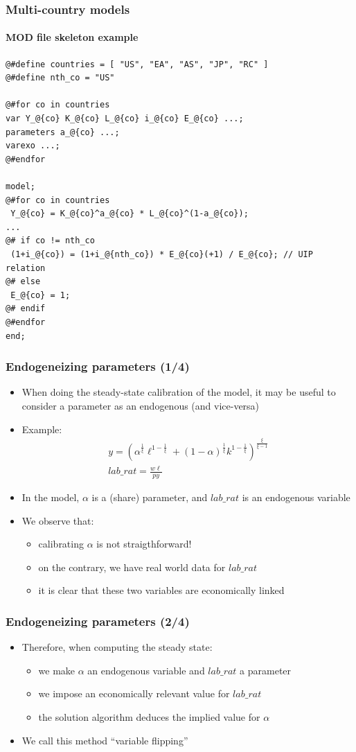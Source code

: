 \documentclass{beamer}
\begin{document}
\begin{frame}[fragile=singleslide]
  \frametitle{Multi-country models}
  \framesubtitle{MOD file skeleton example}
  \scriptsize
\begin{verbatim}
@#define countries = [ "US", "EA", "AS", "JP", "RC" ]
@#define nth_co = "US"

@#for co in countries
var Y_@{co} K_@{co} L_@{co} i_@{co} E_@{co} ...;
parameters a_@{co} ...;
varexo ...;
@#endfor

model;
@#for co in countries
 Y_@{co} = K_@{co}^a_@{co} * L_@{co}^(1-a_@{co});
...
@# if co != nth_co
 (1+i_@{co}) = (1+i_@{nth_co}) * E_@{co}(+1) / E_@{co}; // UIP relation
@# else
 E_@{co} = 1;
@# endif
@#endfor
end;
\end{verbatim}
  \normalsize
\end{frame}

\begin{frame}
  \frametitle{Endogeneizing parameters (1/4)}
  \begin{itemize}
  \item When doing the steady-state calibration of the model, it may be useful to consider a parameter as an endogenous (and vice-versa)
  \item Example:
    \begin{gather*}
      y = \left(\alpha^{\frac{1}{\xi}} \ell^{1-\frac{1}{\xi}} + (1-\alpha)^{\frac{1}{\xi}}k^{1-\frac{1}{\xi}}\right)^{\frac{\xi}{\xi - 1}} \\
      lab\_rat = \frac{w \ell}{p y}
    \end{gather*}
  \item In the model, $\alpha$ is a (share) parameter, and $lab\_rat$ is an endogenous variable
  \item We observe that:
    \begin{itemize}
    \item calibrating $\alpha$ is not straigthforward!
    \item on the contrary, we have real world data for $lab\_rat$
    \item it is clear that these two variables are economically linked
    \end{itemize}
  \end{itemize}
\end{frame}

\begin{frame}[fragile=singleslide]
  \frametitle{Endogeneizing parameters (2/4)}
  \begin{itemize}
  \item Therefore, when computing the steady state:
    \begin{itemize}
    \item we make $\alpha$ an endogenous variable and $lab\_rat$ a parameter
    \item we impose an economically relevant value for $lab\_rat$
    \item the solution algorithm deduces the implied value for $\alpha$
    \end{itemize}
  \item We call this method ``variable flipping''
  \end{itemize}
\end{frame}
\end{document}
